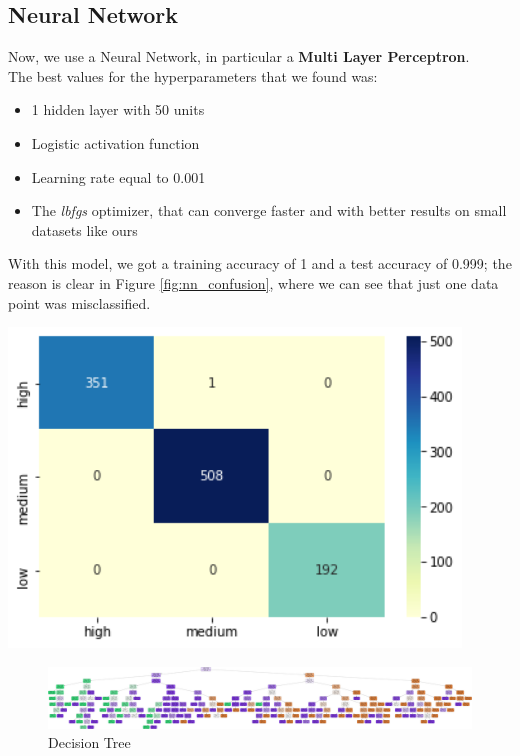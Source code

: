 \subsection{Neural Network}
\begin{minipage}{0.59\textwidth}
Now, we use a Neural Network, in particular a \textbf{Multi Layer Perceptron}.\\
The best values for the hyperparameters that we found was:
\begin{itemize}
\item 1 hidden layer with 50 units
\item Logistic activation function
\item Learning rate equal to 0.001
\item The \emph{lbfgs} optimizer, that can converge faster and with better results on small datasets like ours
\end{itemize}

With this model, we got a training accuracy of 1 and a test accuracy of 0.999; the reason is clear in Figure \ref{fig:nn_confusion}, where we can see that just one data point was misclassified.
\end{minipage}
\begin{minipage}{0.4\textwidth}
\centering
\includegraphics[width=0.90\textwidth]{img/nn_confusion.png}
\captionsetup{justification=centering}
\label{fig:nn_confusion}
\end{minipage}

\begin{figure}
\centering
\includegraphics[width=\linewidth]{img/decision_tree.png}
\caption{Decision Tree}
\label{fig:decision_tree}
\end{figure}

